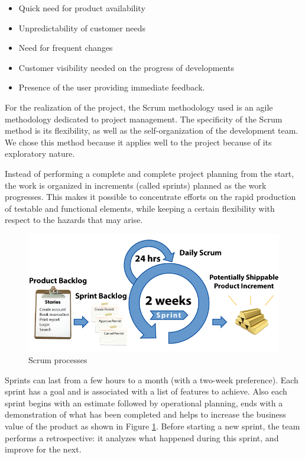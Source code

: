 \documentclass[12pt,a4paper]{report}
\begin{document}
	\begin{itemize}
		\item Quick need for product availability
		\item Unpredictability of customer needs
		\item Need for frequent changes
		\item Customer visibility needed on the progress of developments
		\item Presence of the user providing immediate feedback.
		
	\end{itemize}
	For the realization of the project, the Scrum methodology used is an agile methodology dedicated to project management. The specificity of the Scrum method is its flexibility, as well as the self-organization of the development team. We chose this method because it applies well to the project because of its exploratory nature.\par
	Instead of performing a complete and complete project planning from the start, the work is organized in increments (called sprints) planned as the work progresses. This makes it possible to concentrate efforts on the rapid production of testable and functional elements, while keeping a certain flexibility with respect to the hazards that may arise.\par
	\begin{figure}[H]
		\centering
		\includegraphics[width=5in,keepaspectratio]{scrum.png}
		\caption{ Scrum processes\protect{}\protect\footnotemark[\thefootnote]}
		
		
		\label{scrum-label}
	\end{figure}
	Sprints can last from a few hours to a month (with a two-week preference). Each sprint has a goal and is associated with a list of features to achieve. Also each sprint begins with an estimate followed by operational planning, ends with a demonstration of what has been completed and helps to increase the business value of the product as shown in Figure \ref{scrum-label}. Before starting a new sprint, the team performs a retrospective: it analyzes what happened during this sprint, and improve for the next.
\end{document}
